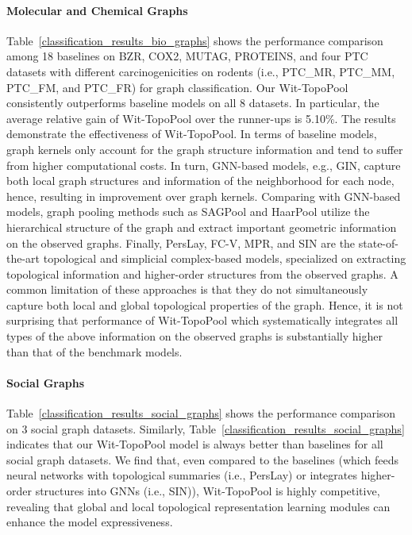 \documentclass[letterpaper]{article} %
\begin{document}
\paragraph{Molecular and Chemical Graphs} Table~\ref{classification_results_bio_graphs} shows the performance comparison among 18 baselines on BZR, COX2, MUTAG, PROTEINS, and four PTC datasets with different carcinogenicities on rodents (i.e., PTC\_MR, PTC\_MM, PTC\_FM, and PTC\_FR) for graph classification. Our Wit-TopoPool consistently outperforms baseline models on all 8 datasets. In particular, the average relative gain of Wit-TopoPool over the runner-ups is 5.10\%. The results demonstrate the effectiveness of Wit-TopoPool. In terms of baseline models, graph kernels only account for the graph structure information and tend to suffer from higher computational costs. In turn, GNN-based models, e.g., GIN, capture both local graph structures and information of the neighborhood for each node, hence, resulting in improvement over graph kernels. Comparing with GNN-based models, graph pooling methods such as SAGPool and HaarPool utilize the hierarchical structure of the graph and extract important geometric information on the observed graphs. Finally, PersLay, FC-V, MPR, and SIN are the state-of-the-art topological and simplicial complex-based models, specialized on extracting topological information and higher-order structures from the observed graphs. A common limitation of these approaches is that they do not simultaneously capture both local and global topological properties of the graph. Hence, it is not surprising that performance of Wit-TopoPool which systematically integrates all types of the above information on the observed graphs is substantially higher than that of the benchmark models.


\paragraph{Social Graphs} Table~\ref{classification_results_social_graphs} shows the performance comparison on 3 social graph datasets. Similarly, Table~\ref{classification_results_social_graphs} indicates that our Wit-TopoPool model is always better than baselines for all social graph datasets. We find that, even compared to the baselines (which feeds neural networks with topological summaries (i.e., PersLay) or integrates higher-order structures into GNNs (i.e., SIN)), Wit-TopoPool is highly competitive, revealing that global and local topological representation learning modules can enhance the model expressiveness.
\end{document}
